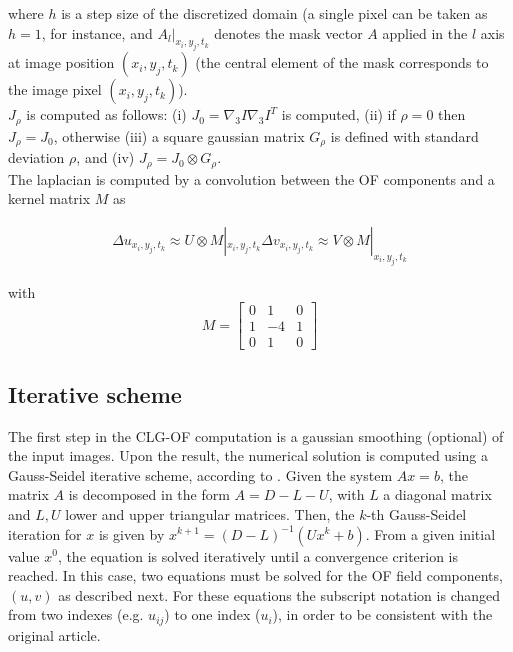 \documentclass{article}
\begin{document}
where $h$ is a step size of the discretized domain (a single pixel can be taken 
as $h=1$, for instance, and $A_l |_{x_i,y_j,t_k}$ denotes the mask vector $A$ 
applied in the $l$ axis at image position $(x_i,y_j,t_k)$ (the central element 
of the mask corresponds to the image pixel $(x_i,y_j,t_k)$).\\

$J_\rho$ is computed as follows: (i) $J_0 = \nabla_3I \nabla_3I^T$ is computed, 
(ii) if $\rho = 0$ then $J_\rho = J_0$, otherwise (iii) a square gaussian matrix 
$G_\rho$ is defined with standard deviation $\rho$, and (iv) 
$J_\rho = J_0 \otimes G_\rho$.\\

The laplacian is computed by a convolution between the OF components and a kernel 
matrix $M$ as

\begin{align}
 \Delta u_{x_i, y_j, t_k} \approx U \otimes M |_{x_i, y_j, t_k}
 \Delta v_{x_i, y_j, t_k} \approx V \otimes M |_{x_i, y_j, t_k}
\end{align}

with
\[
 M = \left[ \begin{matrix}
  0 &  1 & 0 \\
  1 & -4 & 1 \\
  0 &  1 & 0
 \end{matrix} \right]
\]


\subsection{Iterative scheme}

The first step in the CLG-OF computation is a gaussian smoothing (optional) of 
the input images. Upon the result, the numerical solution is computed using a 
Gauss-Seidel iterative scheme, according to \cite{Bruhn05rt}. Given the system 
$Ax = b$, the matrix $A$ is decomposed in the form $A=D-L-U$, with $L$ a 
diagonal matrix and $L,U$ lower and upper triangular matrices. Then, the $k$-th 
Gauss-Seidel iteration for $x$ is given by $x^{k+1}=(D-L)^{-1}(Ux^k+b)$. From a 
given initial value $x^0$, the equation is solved iteratively until a convergence 
criterion is reached. In this case, two equations must be solved for the OF field 
components, $(u,v)$ as described next. For these equations the subscript notation 
is changed from two indexes (e.g. $u_{ij}$) to one index ($u_i$), in order to be 
consistent with the original article.\\
\end{document}
